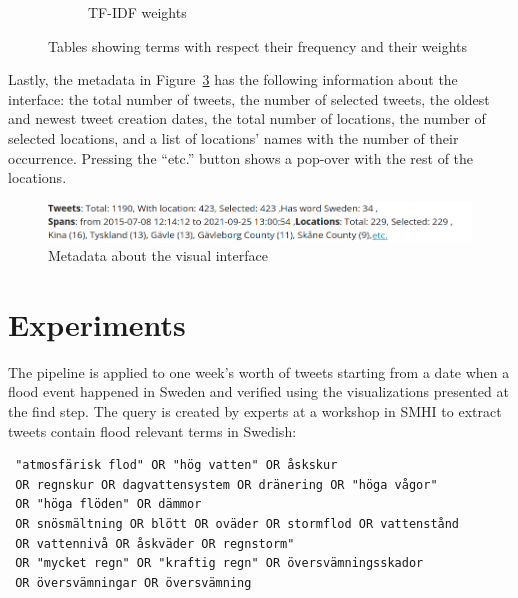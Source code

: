\begin{figure}
\begin{subfigure}[b]{0.48\textwidth}
        \caption{\ac{TF-IDF} weights}
        \label{fig:tfidf_table}
    \end{subfigure}
    \caption{Tables showing terms with respect their frequency and their weights}
    \label{fig:tables_lda_tfidf}
\end{figure}

Lastly, the metadata in Figure~\ref{fig:meta_data} has the following information about the
interface: the total number of tweets, the number of selected tweets, the oldest and newest tweet
creation dates, the total number of locations, the number of selected locations, and a list of
locations' names with the number of their occurrence. Pressing the ``etc.'' button shows a pop-over
with the rest of the locations. 

\begin{figure}[H]
    \begin{center}
        \includegraphics[width=\columnwidth]{./images/meta_data.png}
    \end{center}
    \caption{Metadata about the visual interface}
    \label{fig:meta_data}
\end{figure}

\section{Experiments}

The pipeline is applied to one week's worth of tweets starting from a date when a flood event happened
in Sweden and verified using the visualizations presented at the find step. The query is created by
experts at a workshop in \ac{SMHI} to extract tweets contain flood relevant terms in Swedish:

\begin{verbatim}
 "atmosfärisk flod" OR "hög vatten" OR åskskur
 OR regnskur OR dagvattensystem OR dränering OR "höga vågor"
 OR "höga flöden" OR dämmor
 OR snösmältning OR blött OR oväder OR stormflod OR vattenstånd
 OR vattennivå OR åskväder OR regnstorm"
 OR "mycket regn" OR "kraftig regn" OR översvämningsskador 
 OR översvämningar OR översvämning
\end{verbatim}
